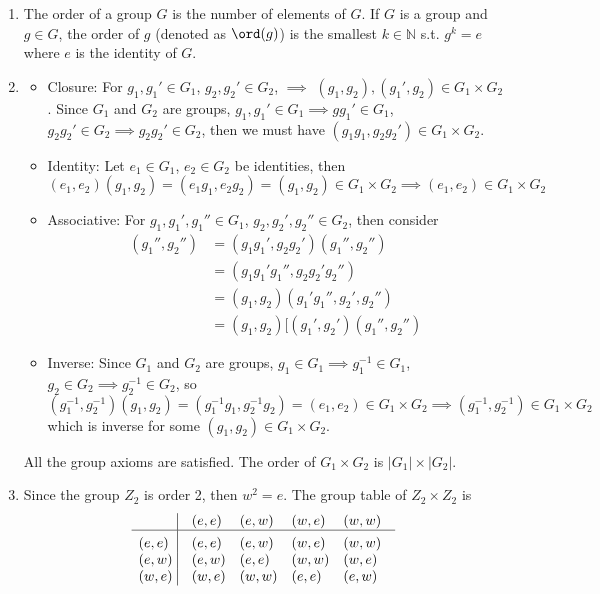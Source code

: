 \documentclass[a4paper]{article}
\begin{document}
\begin{ans}\leavevmode
\begin{enumerate}[label=(\roman*)]
\item The order of a group $G$ is the number of elements of $G$. If $G$ is a group and $g\in G$, the order of $g$ (denoted as $\ord(g)$) is the smallest $k\in\mathbb{N}$ s.t. $g^k=e$ where $e$ is the identity of $G$.
\item 
\begin{itemize}
    \item Closure: For $g_1,g_1'\in G_1$, $g_2,g_2'\in G_2$, $\implies$ $(g_1,g_2),(g_1',g_2)\in G_1\times G_2$. Since $G_1$ and $G_2$ are groups, $g_1,g_1'\in G_1\implies gg_1'\in G_1$, $g_2g_2'\in G_2\implies g_2g_2'\in G_2$, then we must have $(g_1g_1,g_2g_2')\in G_1\times G_2$.
    \item Identity: Let $e_1\in G_1$, $e_2\in G_2$ be identities, then 
    $$(e_1,e_2)(g_1,g_2)=(e_1g_1,e_2g_2)=(g_1,g_2)\in G_1\times G_2\implies (e_1,e_2)\in G_1\times G_2$$
    \item Associative: For $g_1,g_1',g_1''\in G_1$, $g_2,g_2',g_2''\in G_2$, then consider
    \begin{align}
    [(g_1,g_2)(g_1',g_2')](g_1'',g_2'')&=(g_1g_1',g_2g_2')(g_1'',g_2'')\nonumber\\&=(g_1g_1'g_1'',g_2g_2'g_2'')\nonumber\\&=(g_1,g_2)(g_1'g_1'',g_2',g_2'')\nonumber\\&=(g_1,g_2)[(g_1',g_2')(g_1'',g_2'')\nonumber
    \end{align}
    \item Inverse: Since $G_1$ and $G_2$ are groups, $g_1\in G_1\implies g_1^{-1}\in G_1$, $g_2\in G_2\implies g_2^{-1}\in G_2$, so 
    $$(g_1^{-1},g_2^{-1})(g_1,g_2)=(g_1^{-1}g_1,g_2^{-1}g_2)=(e_1,e_2)\in G_1\times G_2\implies(g_1^{-1},g_2^{-1})\in G_1\times G_2$$
    which is inverse for some $(g_1,g_2)\in G_1\times G_2$.
\end{itemize}
All the group axioms are satisfied. The order of $G_1\times G_2$ is $|G_1|\times|G_2|$.
\item Since the group $Z_2$ is order 2, then $w^2=e$. The group table of $Z_2\times Z_2$ is
$$\vbox{\tabskip0.5em\offinterlineskip
    \halign{\strut$#$\hfil\ \tabskip1em\vrule&&$#$\hfil\cr
      & (e,e)   & (e,w)  & (w,e) & (w,w)     \cr
    \noalign{\hrule}\vrule height 12pt width 0pt
    (e,e)   & (e,e)   & (e,w)  & (w,e) & (w,w)      \cr
    (e,w)   & (e,w)   & (e,e) & (w,w) & (w,e)      \cr
    (w,e) & (w,e) & (w,w) & (e,e) & (e,w)     \cr
}}$$
\end{enumerate}
\end{ans}
\end{document}
